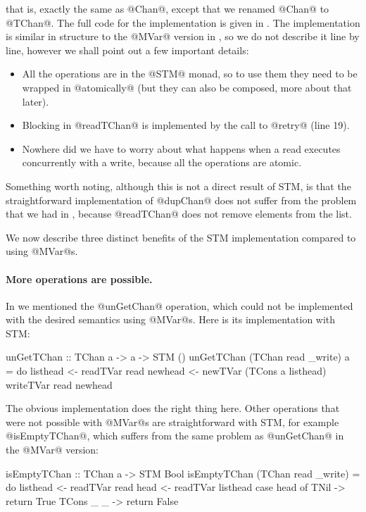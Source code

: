 \noindent that is, exactly the same as @Chan@, except that we renamed
@Chan@ to @TChan@.  The full code for the implementation is given in
.  The implementation is similar in structure to the
@MVar@ version in , so we do not describe it line by
line, however we shall point out a few important details:

\begin{itemize}
\item All the operations are in the @STM@ monad, so to use them they
  need to be wrapped in @atomically@ (but they can also be composed,
  more about that later).
\item Blocking in @readTChan@ is implemented by the call to @retry@
  (line 19).
\item Nowhere did we have to worry about what happens when a read
  executes concurrently with a write, because all the operations are
  atomic.
\end{itemize}

Something worth noting, although this is not a direct result of STM,
is that the straightforward implementation of @dupChan@ does not
suffer from the problem that we had in , because
@readTChan@ does not remove elements from the list.

We now describe three distinct benefits of the STM implementation
compared to using @MVar@s.

\paragraph{More operations are possible.} In  we
mentioned the @unGetChan@ operation, which could not be implemented
with the desired semantics using @MVar@s.  Here is its implementation
with STM:

\begin{haskell}
unGetTChan :: TChan a -> a -> STM ()
unGetTChan (TChan read _write) a = do
   listhead <- readTVar read
   newhead <- newTVar (TCons a listhead)
   writeTVar read newhead
\end{haskell}

\noindent The obvious implementation does the right thing here.  Other
operations that were not possible with @MVar@s are straightforward
with STM, for example @isEmptyTChan@, which suffers from the same
problem as @unGetChan@ in the @MVar@ version:

\begin{haskell}
isEmptyTChan :: TChan a -> STM Bool
isEmptyTChan (TChan read _write) = do
  listhead <- readTVar read
  head <- readTVar listhead
  case head of
    TNil -> return True
    TCons _ _ -> return False
\end{haskell}

